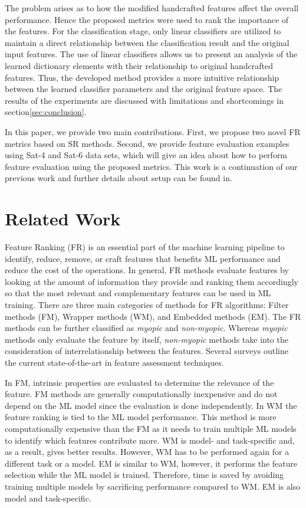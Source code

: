 The problem arises as to how the modified handcrafted features affect the overall performance. Hence the proposed metrics were used to rank the importance of the features. For the classification stage, only linear classifiers are utilized to maintain a direct relationship between the classification result and the original input features. The use of linear classifiers allows us to present an analysis of the learned dictionary elements with their relationship to original handcrafted features. Thus, the developed method provides a more intuitive relationship between the learned classifier parameters and the original feature space. The results of the experiments are discussed with limitations and shortcomings in section\ref{sec:conclusion}. 

In this paper, we provide two main contributions. First, we propose two novel FR metrics based on SR methods. Second, we provide feature evaluation examples using Sat-4 and Sat-6 data sets, which will give an idea about how to perform feature evaluation using the proposed metrics. This work is a continuation of our previous work and further details about setup can be found in\cite{Liyanage2020}. 

\section{Related Work}\label{sec:relatedwork}

Feature Ranking (FR) is an essential part of the machine learning pipeline to identify, reduce, remove, or craft features that benefits ML performance and reduce the cost of the operations. In general, FR methods evaluate features by looking at the amount of information they provide and ranking them accordingly so that the most relevant and complementary features can be used in ML training. There are three main categories of methods for FR algorithms: Filter methods (FM), Wrapper methods (WM), and Embedded methods (EM). The FR methods can be further classified as \emph{myopic} and \emph{non-myopic}. Whereas \emph{myopic} methods only evaluate the feature by itself, \emph{non-myopic} methods take into the consideration of interrelationship between the features. Several surveys outline the current state-of-the-art in feature assessment techniques\cite{Uthman2020, Sangodiah2014, Effrosynidis2021, Jovic2015}.

In FM, intrinsic properties are evaluated to determine the relevance of the feature. FM methods are generally computationally inexpensive and do not depend on the ML model since the evaluation is done independently. In WM the feature ranking is tied to the ML model performance. This method is more computationally expensive than the FM as it needs to train multiple ML models to identify which features contribute more. WM is model- and task-specific and, as a result, gives better results. However, WM has to be performed again for a different task or a model. EM is similar to WM, however, it performs the feature selection while the ML model is trained. Therefore, time is saved by avoiding training multiple models by sacrificing performance compared to WM\@. EM is also model and task-specific.  

